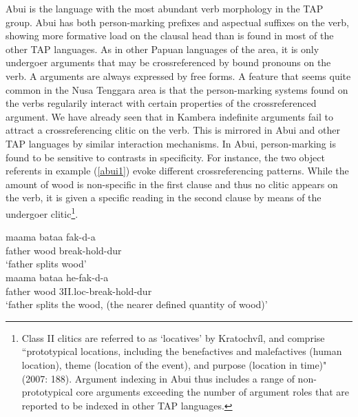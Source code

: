 Abui is the language with the most abundant verb morphology in the TAP group. Abui has both person-marking prefixes and aspectual suffixes on the verb, showing more formative load on the clausal head than is found in most of the other TAP languages. As in other Papuan languages of the area, it is only undergoer arguments that may be crossreferenced by bound pronouns on the verb. A arguments are always expressed by free forms. A feature that seems quite common in the Nusa Tenggara area is that the person-marking systems found on the verbs regularily interact with certain properties of the crossreferenced argument. We have already seen that in Kambera indefinite arguments fail to attract a crossreferencing clitic on the verb. This is mirrored in Abui and other TAP languages by similar interaction mechanisms. In Abui, person-marking is found to be sensitive to contrasts in specificity. For instance, the two object referents in example (\ref{abui1}) evoke different crossreferencing patterns. While the amount of wood is non-specific in the first clause and thus no clitic appears on the verb, it is given a specific reading in the second clause by means of the undergoer clitic\footnote{Class II clitics are referred to as `locatives' by Kratochvíl, and comprise ``prototypical locations, including the
benefactives and malefactives (human location), theme (location of the event), and
purpose (location in time)" (2007: 188). Argument indexing in Abui thus includes a range of non-prototypical core arguments exceeding the number of argument roles that are reported to be indexed in other TAP languages.}.

\pex \label{abui1}
\a
\gll maama bataa fak-d-a \\
father wood break-hold-\acs{dur} \\
\glft `father splits wood’ \\ 
\z
\a
\gla maama bataa he-fak-d-a \\ 
father wood \acs{3}II.\acs{loc}-break-hold-\acs{dur} \\
\glft `father splits the wood, (the nearer defined quantity of wood)’ \\ 
\z
\xe

